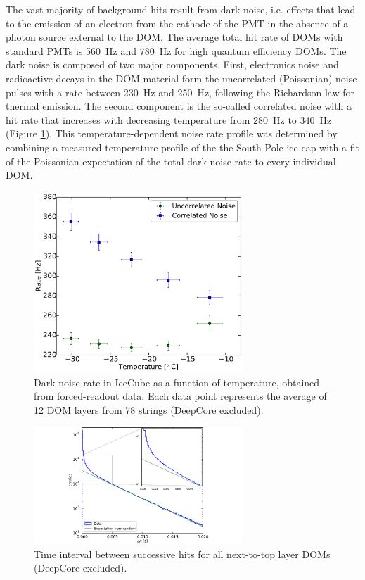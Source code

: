 The vast majority of background hits result from dark noise, i.e. effects
that lead to the emission of an electron from the cathode of the PMT in the
absence of a photon source external to the DOM. The average total hit rate of
DOMs with standard PMTs is \SI{560}{\hertz} and \SI{780}{\hertz} for high
quantum efficiency DOMs.  The dark noise is composed of two major 
components.  First, electronics noise and radioactive decays in the DOM material form
the uncorrelated (Poissonian) noise pulses with a rate between
\SI{230}{\hertz} and \SI{250}{\hertz}, following the Richardson law for
thermal emission.  The second component is the so-called correlated
noise with a hit rate that increases with decreasing temperature from
\SI{280}{\hertz} to \SI{340}{\hertz} (Figure
\ref{fig:dom_darknoise_vs_temperature}).  This temperature-dependent noise
rate profile was determined by combining a measured temperature profile of
the the South Pole ice cap \cite{price2002temperature} with a fit of the
Poissonian expectation of the total dark noise rate to every individual
DOM.

\begin{figure}
  \centering
  \includegraphics[width=0.7\textwidth]{graphics/dom/performance/darknoise/HitRatevsTemp_inice_nomuons_nofit_bigfont.pdf}
  \caption{Dark noise rate in IceCube as a function of temperature, obtained from forced-readout
    data. Each data point represents the average of 12 DOM layers from 78 strings (DeepCore excluded).}
  \label{fig:dom_darknoise_vs_temperature}
\end{figure}

\begin{figure}
  \centering
  \includegraphics[width=0.7\textwidth]{graphics/dom/performance/darknoise/DarkNoise_Layer2Doms.pdf}
 \caption{Time interval between successive hits for all next-to-top layer DOMs (DeepCore excluded).}
 \label{fig:darknoise_deltaT}
\end{figure}

